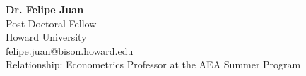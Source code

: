 \documentclass{article}
\begin{document}
\vspace{2em}


\textbf{Dr. Felipe Juan} \\
Post-Doctoral Fellow \\
Howard University \\
felipe.juan@bison.howard.edu \\
Relationship: Econometrics Professor at the AEA Summer Program

\end{document}
